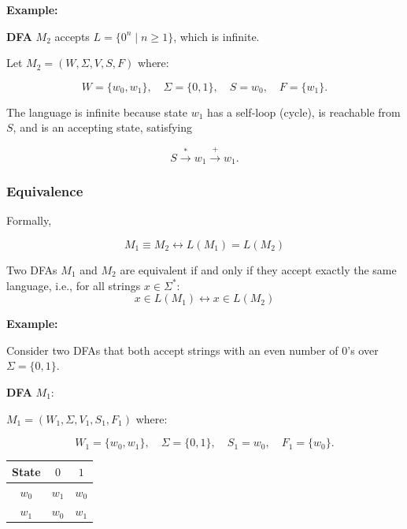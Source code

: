 \documentclass[12pt,a4paper,openany]{article}
\begin{document}
\begin{enumerate}
\textbf{Example:}

\textbf{DFA} $M_2$ accepts $L = \{0^n \mid n \geq 1\}$, which is infinite.

Let $M_2 = (W, \Sigma, V, S, F)$ where:

\[
W = \{w_0, w_1\},\quad
\Sigma = \{0,1\},\quad
S = w_0,\quad
F = \{w_1\}.
\]

\begin{center}
\end{center}

The language is infinite because state $w_1$ has a self-loop (cycle), is reachable from $S$, and is an accepting state, satisfying

\[
S \xrightarrow{*} w_1 \xrightarrow{+} w_1.
\]

\end{enumerate}

\subsubsection{Equivalence}

Formally,

\[M_1 \equiv M_2 \leftrightarrow L(M_1) = L(M_2)\]

Two DFAs $M_1$ and $M_2$ are equivalent if and only if they accept exactly the same language, i.e., for all strings $x \in \Sigma^*$:
\[x \in L(M_1) \leftrightarrow x \in L(M_2)\]

\textbf{Example:} 

Consider two DFAs that both accept strings with an even number of $0$'s over $\Sigma = \{0,1\}$.

\textbf{DFA} $M_1$:

$M_1 = (W_1, \Sigma, V_1, S_1, F_1)$ where:

\[
W_1 = \{w_0, w_1\},\quad
\Sigma = \{0,1\},\quad
S_1 = w_0,\quad
F_1 = \{w_0\}.
\]

\begin{center}
\begin{tabular}{c|cc}
State & $0$ & $1$ \\
\hline
$w_0$ & $w_1$ & $w_0$ \\
$w_1$ & $w_0$ & $w_1$ \\
\end{tabular}
\end{center}
\end{document}
